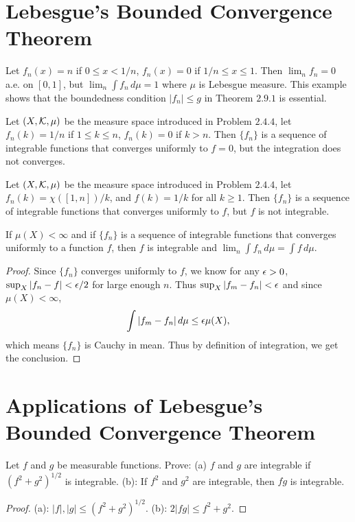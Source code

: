 \section{Lebesgue's Bounded Convergence Theorem}
\begin{pro}%
	Let $f_n(x)=n$ if $0\leq x<1/n$, $f_n(x)=0$ if $1/n\leq x\leq 1$. Then $\lim_n f_n=0$ a.e. on $[0,1]$, but $\lim_n \int f_n\,d\mu=1$ where $\mu$ is Lebesgue measure. This example shows that the boundedness condition $|f_n|\leq g$ in Theorem $2.9.1$ is essential.
\end{pro}

\begin{pro}%
	Let $(X,\mathcal{K},\mu)$ be the measure space introduced in Problem $2.4.4$, let $f_n(k)=1/n$ if $1\leq k\leq n$, $f_n(k)=0$ if $k>n$. Then $\{f_n\}$ is a sequence of integrable functions that converges uniformly to $f=0$, but the integration does not converges. 
\end{pro}

\begin{pro}%
	Let $(X,\mathcal{K},\mu)$ be the measure space introduced in Problem $2.4.4$, let $f_n(k)=\chi([1,n])/k$, and $f(k)=1/k$ for all $k\geq 1$. Then $\{f_n\}$ is a sequence of integrable functions that converges uniformly to $f$, but $f$ is not integrable.
\end{pro}

\begin{pro}%
	If $\mu(X)<\infty$ and if $\{f_n\}$ is a sequence of integrable functions that converges uniformly to a function $f$, then $f$ is integrable and $\lim_n \int f_n\,d\mu=\int f\,d\mu$.
\end{pro}
\begin{proof}
	Since $\{f_n\}$ converges uniformly to $f$, we know for any $\epsilon>0$, $\sup_{X}|f_n-f|<\epsilon/2$ for large enough $n$. Thus $\sup_{X}|f_m-f_n|<\epsilon$ and since $\mu(X)<\infty$,
	\[\int |f_m-f_n|\,d\mu\leq \epsilon\mu(X),\]
	which means $\{f_n\}$ is Cauchy in mean. Thus by definition of integration, we get the conclusion.
\end{proof}

\section{Applications of Lebesgue's Bounded Convergence Theorem}
\begin{pro}%
	Let $f$ and $g$ be measurable functions. Prove: (a) $f$ and $g$ are integrable if $(f^2+g^2)^{1/2}$ is integrable. (b): If $f^2$ and $g^2$ are integrable, then $fg$ is integrable.
\end{pro}
\begin{proof}
	(a): $|f|,|g|\leq (f^2+g^2)^{1/2}$. (b): $2|fg|\leq f^2+g^2$.
\end{proof}

